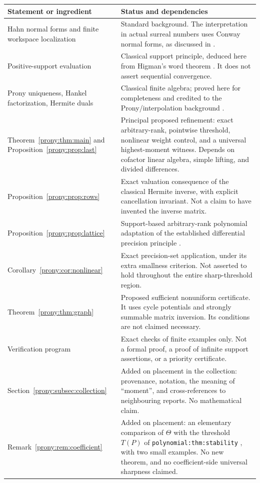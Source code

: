 \documentclass[11pt,letterpaper]{article}
\theoremstyle{definition}
\theoremstyle{remark}
\newcommand{\lbl}[1]{\nolinkurl{#1}}%
\begin{document}
\begin{longtable}{>{\raggedright\arraybackslash}p{}>{\raggedright\arraybackslash}p{}}
\toprule
Statement or ingredient & Status and dependencies\\
\midrule\endhead
Hahn normal forms and finite workspace localization &
Standard background. The interpretation in actual surreal numbers uses
Conway normal forms, as discussed in \cite{BG,Repo}.\\[5pt]
Positive-support evaluation &
Classical support principle, deduced here from Higman's word theorem
\cite{Higman}. It does not assert sequential convergence.\\[5pt]
Prony uniqueness, Hankel factorization, Hermite duals &
Classical finite algebra; proved here for completeness and credited to the
Prony/interpolation background \cite{BY,KDB}.\\[5pt]
Theorem~\ref{prony:thm:main} and Proposition~\ref{prony:prop:last} &
Principal proposed refinement: exact arbitrary-rank, pointwise threshold,
nonlinear weight control, and a universal highest-moment witness. Depends
on cofactor linear algebra, simple lifting, and divided differences.\\[5pt]
Proposition~\ref{prony:prop:rows} &
Exact valuation consequence of the classical Hermite inverse, with explicit
cancellation invariant. Not a claim to have invented the inverse matrix.\\[5pt]
Proposition~\ref{prony:prop:lattice} &
Support-based arbitrary-rank polynomial adaptation of the established
differential precision principle \cite{CRV}.\\[5pt]
Corollary~\ref{prony:cor:nonlinear} &
Exact precision-set application, under its extra smallness criterion.
Not asserted to hold throughout the entire sharp-threshold region.\\[5pt]
Theorem~\ref{prony:thm:graph} &
Proposed sufficient nonuniform certificate. It uses cycle potentials and
strongly summable matrix inversion. Its conditions are not claimed
necessary.\\[5pt]
Verification program &
Exact checks of finite examples only. Not a formal proof, a proof of
infinite support assertions, or a priority certificate.\\[5pt]
Section~\ref{prony:subsec:collection} &
Added on placement in the collection: provenance, notation, the meaning of
``moment'', and cross-references to neighbouring reports. No mathematical
claim.\\[5pt]
Remark~\ref{prony:rem:coefficient} &
Added on placement: an elementary comparison of $\Theta$ with the threshold
$T(P)$ of \lbl{polynomial:thm:stability} \cite{RepoPoly}, with two small
examples. No new theorem, and no coefficient-side universal sharpness
claimed.\\
\bottomrule
\end{longtable}
\end{document}
